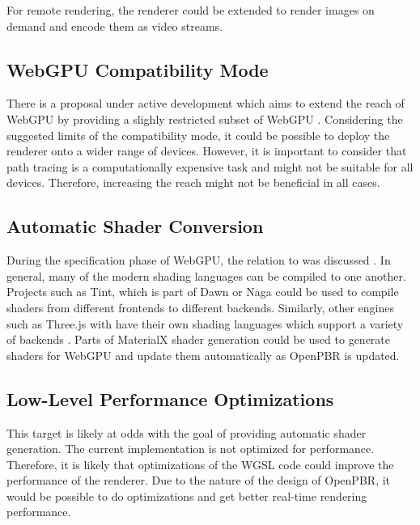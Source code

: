 For remote rendering, the renderer could be extended to render images on demand and encode them as video streams.

\subsection*{WebGPU Compatibility Mode}

There is a proposal under active development which aims to extend the reach of WebGPU by providing a slighly restricted subset of WebGPU \cite{WebGPUCompatibilityModeProposal}. Considering the suggested limits of the compatibility mode, it could be possible to deploy the renderer onto a wider range of devices. However, it is important to consider that path tracing is a computationally expensive task and might not be suitable for all devices. Therefore, increasing the reach might not be beneficial in all cases.

\subsection*{Automatic Shader Conversion}

During the specification phase of WebGPU, the relation to  was discussed \cite{webGPUSpirVRelation}. In general, many of the modern shading languages can be compiled to one another. Projects such as Tint, which is part of \gls{Dawn} \cite{dawnImplementation} or Naga \cite{nagaImplementation} could be used to compile shaders from different frontends to different backends. Similarly, other engines such as \gls{Three.js} with  have their own shading languages which support a variety of backends \cite{ThreeJSShadingLanguage}. Parts of \gls{MaterialX} shader generation could be used to generate shaders for WebGPU and update them automatically as \gls{OpenPBR} is updated.

\subsection*{Low-Level Performance Optimizations}

This target is likely at odds with the goal of providing automatic shader generation. The current implementation is not optimized for performance. Therefore, it is likely that optimizations of the \gls{WGSL} code could improve the performance of the renderer. Due to the nature of the design of \gls{OpenPBR}, it would be possible to do optimizations and get better real-time rendering performance.


